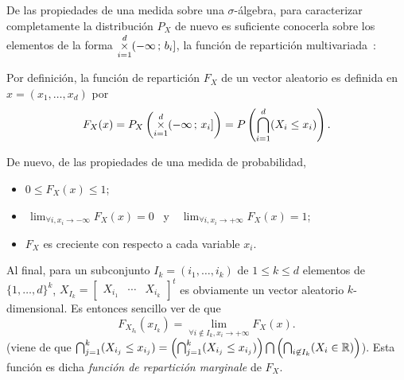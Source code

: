 De las propiedades de una medida sobre una $\sigma$-\'algebra, para caracterizar
completamente la distribuci\'on $P_X$ de nuevo es suficiente conocerla sobre los
elementos de  la forma $\displaystyle  \operatorname*{\times}_{i=1}^d (-\infty \, ;  \, b_i]$,
\ie  la funci\'on  de repartici\'on  multivariada~\cite{AthLah06,  Coh13, Bre88,
  HogMck13}:
%
\begin{definicion}
  Por  definici\'on,  la  funci\'on  de  repartici\'on  $F_X$  de  un vector
  aleatorio es definida en $x = (x_1 , \ldots , x_d)$ por
  \[
  F_X(x) =  P_X\left( \operatorname*{\times}_{i=1}^d (-\infty \,  ; \, x_i]  \right) = P\left(
    \bigcap_{i=1}^d (X_i \le x_i) \right).
  \]
\end{definicion}
%
De nuevo, de las propiedades de una medida de probabilidad,
%
\begin{itemize}
\item $0 \le F_X(x) \le 1$;
%
\item $\displaystyle  \, \lim_{\forall  i, x_i \to  -\infty} F_X(x)  = 0$ \  y \
  $\displaystyle \, \lim_{\forall i, x_i \to +\infty} F_X(x) = 1$;
%
\item $F_X$ es creciente con respecto a cada variable $x_i$.
\end{itemize}
%
Al  final, para  un subconjunto  $I_k =  (i_1,\ldots,i_k)$ de  $1 \le  k  \le d$
elementos de  $\{ 1  , \ldots ,  d \}^k$,  $X_{I_k} = \begin{bmatrix}  X_{i_1} &
  \cdots   &   X_{i_k}\end{bmatrix}^t$  es   obviamente   un  vector   aleatorio
$k$-dimensional. Es entonces sencillo ver de que
%
\[
F_{X_{I_k}}(x_{I_k}) = \lim_{\forall i \not\in I_k, x_i \to +\infty} F_X(x).
\label{Pagina:MP:MarginalesF}
\]
%
(viene de  que $\bigcap_{j=1}^k (X_{i_j}  \le x_{i_j}) =  \left( \bigcap_{j=1}^k
  (X_{i_j} \le x_{i_j}) \right) \bigcap  \left( \bigcap_{i \not\in I_k} (X_i \in
  \mathbb{R})  \right)$). Esta  funci\'on es  dicha {\it  funci\'on  de repartici\'on
  marginale} de $F_X$.

